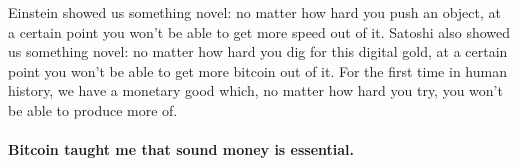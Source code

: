 Einstein showed us something novel: no matter how hard you push an
object, at a certain point you won't be able to get more speed out of
it. Satoshi also showed us something novel: no matter how hard you dig
for this digital gold, at a certain point you won't be able to get more
bitcoin out of it. For the first time in human history, we have a
monetary good which, no matter how hard you try, you won't be able to
produce more of.

\paragraph{Bitcoin taught me that sound money is essential.}

%
%
%
%
%
%
%
%
